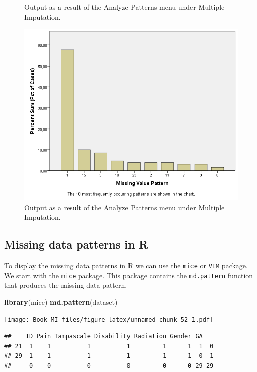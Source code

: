 \documentclass[]{book}
\newenvironment{Shaded}{\begin{snugshade}}{\end{snugshade}}
\newcommand{\KeywordTok}[1]{\textcolor[rgb]{0.13,0.29,0.53}{\textbf{#1}}}
\newcommand{\NormalTok}[1]{#1}
\begin{document}
\begin{figure}
{}

\caption{Output as a result of the Analyze Patterns menu under Multiple Imputation.}\label{fig:fig2-6}
\end{figure}\begin{figure}

{\centering \includegraphics[width=0.9\linewidth]{images/fig2.6d} 

}

\caption{Output as a result of the Analyze Patterns menu under Multiple Imputation.}\label{fig:fig2-6}
\end{figure}

\subsection{Missing data patterns in
R}\label{missing-data-patterns-in-r}

To display the missing data patterns in R we can use the \texttt{mice}
or \texttt{VIM} package. We start with the \texttt{mice} package. This
package contains the \texttt{md.pattern} function that produces the
missing data pattern.

\begin{Shaded}
\begin{Highlighting}[]
\KeywordTok{library}\NormalTok{(mice)}
\KeywordTok{md.pattern}\NormalTok{(dataset)}
\end{Highlighting}
\end{Shaded}

\texttt{[image: Book\_MI\_files/figure-latex/unnamed-chunk-52-1.pdf]}

\begin{verbatim}
##    ID Pain Tampascale Disability Radiation Gender GA   
## 21  1    1          1          1         1      1  1  0
## 29  1    1          1          1         1      1  0  1
##     0    0          0          0         0      0 29 29
\end{verbatim}
\end{document}
